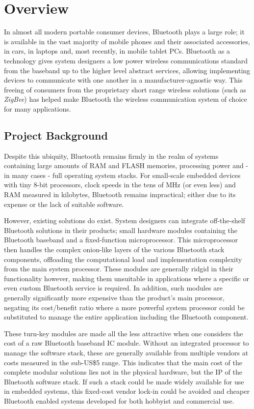\chapter{Overview}
\label{Chapter1}

In almost all modern portable consumer devices, Bluetooth plays a large role; it is available in the vast majority of mobile phones and their associated accessories, in cars, in laptops and, most recently, in mobile tablet PCs. Bluetooth as a technology gives system designers a low power wireless communications standard from the baseband up to the higher level abstract services, allowing implementing devices to communicate with one another in a manufacturer-agnostic way. This freeing of consumers from the proprietary short range wireless solutions (such as \textit{ZigBee}) has helped make Bluetooth the wireless communication system of choice for many applications.

\section{Project Background}

Despite this ubiquity, Bluetooth remains firmly in the realm of systems containing large amounts of RAM and FLASH memories, processing power and - in many cases - full operating system stacks. For small-scale embedded devices with tiny 8-bit processors, clock speeds in the tens of MHz (or even less) and RAM measured in kilobytes, Bluetooth remains impractical; either due to its expense or the lack of suitable software.

However, existing solutions do exist. System designers can integrate off-the-shelf Bluetooth solutions in their products; small hardware modules containing the Bluetooth baseband and a fixed-function microprocessor. This microprocessor then handles the complex onion-like layers of the various Bluetooth stack components, offloading the computational load and implementation complexity from the main system processor. These modules are generally ridgid in their functionality however, making them unsuitable in applications where a specific or even custom Bluetooth service is required. In addition, such modules are generally significantly more expensive than the product's main processor, negating its cost/benefit ratio where a more powerful system processor could be substituted to manage the entire application including the Bluetooth component.

These turn-key modules are made all the less attractive when one considers the cost of a raw Bluetooth baseband IC module. Without an integrated processor to manage the software stack, these are generally available from multiple vendors at costs measured in the sub-US\$5 range. This indicates that the main cost of the complete modular solutions lies not in the physical hardware, but the IP of the Bluetooth software stack. If such a stack could be made widely available for use in embedded systems, this fixed-cost vendor lock-in could be avoided and cheaper Bluetooth enabled systems developed for both hobbyist and commercial use.

